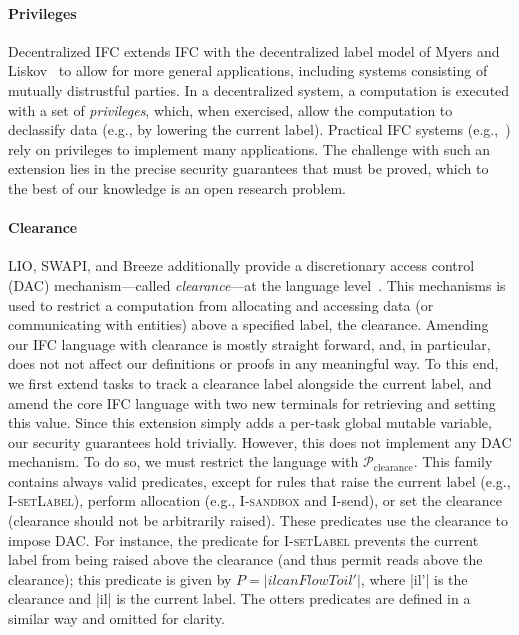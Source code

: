 \paragraph{Privileges}
Decentralized IFC extends IFC with the decentralized label model of
Myers and Liskov~\cite{myers:dlm} to allow for more general
applications, including systems consisting of mutually distrustful
parties.  In a decentralized system, a computation is executed with a
set of \emph{privileges}, which, when exercised, allow the computation
to declassify data (e.g., by lowering the current label).
%
Practical IFC systems
(e.g.,~\cite{Zeldovich:2006, lio,
Hritcu:2013:YIB:2497621.2498098, myers:jif}) rely on privileges to
implement many applications.
%
%
The challenge with such an extension lies in the precise
security guarantees that must be proved, which to the best of our
knowledge is an open research problem.
%

\paragraph{Clearance}
%
LIO, SWAPI, and Breeze additionally provide a discretionary access
control (DAC) mechanism---called \emph{clearance}---at the language
level~\cite{Hritcu:2013:YIB:2497621.2498098, lio}.
%
This mechanisms is used to restrict a computation from allocating and
accessing data (or communicating with entities) above a specified
label, the clearance.
%
Amending our IFC language with clearance is mostly straight forward,
and, in particular, does not not affect our definitions or proofs in
any meaningful way.
%
To this end, we first extend tasks to track a clearance label
alongside the current label, and amend the core IFC language with two
new terminals for retrieving and setting this value.
%
Since this extension simply adds a per-task global mutable variable,
our security guarantees hold trivially.
%
However, this does not implement any DAC mechanism.
%
To do so, we must restrict the language with
$\mathcal{P}_\text{clearance}$.
%
This family contains always valid predicates, except for rules that
raise the current label (e.g., \textsc{I-setLabel}), perform
allocation (e.g., \textsc{I-sandbox} and \textsf{I-send}), or set the
clearance (clearance should not be arbitrarily raised).
%
These predicates use the clearance to impose DAC.
%
For instance, the predicate for \textsc{I-setLabel} prevents the
current label from being raised above the clearance (and thus permit
reads above the clearance); this predicate is given by $P = |il
canFlowTo il'|$, where |il'| is the clearance and |il| is the current
label.
%
The otters predicates are defined in a similar way and omitted for
clarity.



